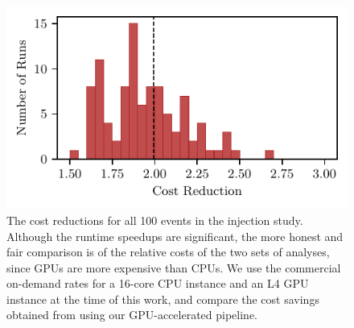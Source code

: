 \documentclass[fleqn,usenatbib]{mnras}
\begin{document}
\begin{figure}
    \centering
    \includegraphics{figures/cost_reduction.pdf}
    \caption{The cost reductions for all 100 events in the injection study.
    Although the runtime speedups are significant, the more honest and fair comparison
    is of the relative costs of the two sets of analyses, since GPUs are more
    expensive than CPUs. We use the commercial on-demand rates for a 16-core CPU
    instance and an L4 GPU instance at the time of this work, and compare the cost savings
    obtained from using our GPU-accelerated pipeline.}
    \label{fig:cost_reduction}
\end{figure}
\end{document}

